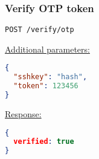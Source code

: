 %
%
%
%
%
%
%


\subsubsection{Verify OTP token}

\begin{lstlisting}[language=http_request]
POST /verify/otp
\end{lstlisting}

{\tiny \underline{Additional parameters:}}
\begin{lstlisting}[language=json, numbers=none]
{
  "sshkey": "hash",
  "token": 123456
}
\end{lstlisting}


{\tiny \underline{Response:}}
\begin{lstlisting}[language=json, numbers=none]
{
  verified: true
}
\end{lstlisting}
